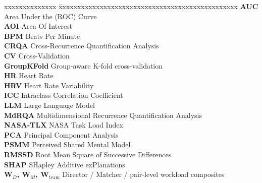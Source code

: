 \documentclass[BTech]{iitmdiss}
\begin{document}
\pagebreak

\begin{singlespace}
\tableofcontents
\thispagestyle{empty}
\listoftables
{}
\listoffigures
{}
\end{singlespace}

\newpage
\begin{tabbing}
\end{tabbing}
\abbreviations
\noindent
\begin{tabbing}
xxxxxxxxxxxxxx \= xxxxxxxxxxxxxxxxxxxxxxxxxxxxxxxxxxxxxxxxxxxxxxxx \kill
\textbf{AUC} \> Area Under the (ROC) Curve \\
\textbf{AOI} \> Area Of Interest \\
\textbf{BPM} \> Beats Per Minute \\
\textbf{CRQA} \> Cross-Recurrence Quantification Analysis \\
\textbf{CV}  \> Cross-Validation \\
\textbf{GroupKFold} \> Group-aware K-fold cross-validation \\
\textbf{HR}  \> Heart Rate \\
\textbf{HRV} \> Heart Rate Variability \\
\textbf{ICC} \> Intraclass Correlation Coefficient \\
\textbf{LLM} \> Large Language Model \\
\textbf{MdRQA} \> Multidimensional Recurrence Quantification Analysis \\
\textbf{NASA-TLX} \> NASA Task Load Index \\
\textbf{PCA} \> Principal Component Analysis \\
\textbf{PSMM} \> Perceived Shared Mental Model \\
\textbf{RMSSD} \> Root Mean Square of Successive Differences \\
\textbf{SHAP} \> SHapley Additive exPlanations \\
\textbf{W$_D$, W$_M$, W$_{\text{team}}$} \> Director / Matcher / pair-level workload composites \\
\end{tabbing}

\pagebreak

\end{document}
